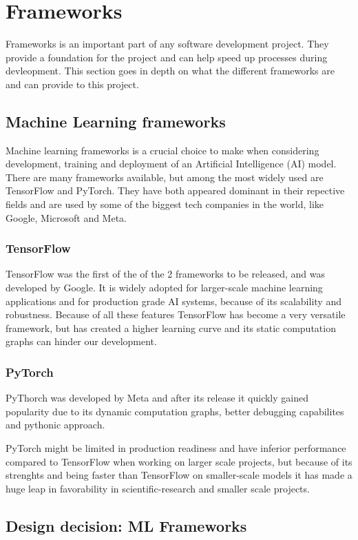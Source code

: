 \section{Frameworks}
\label{sec:Frameworks}

Frameworks is an important part of any software development project.
They provide a foundation for the project and can help speed up processes
during devleopment. This section goes in depth on what the different frameworks
are and can provide to this project.

\subsection{Machine Learning frameworks}

Machine learning frameworks is a crucial choice to make when considering development,
training and deployment of an Artificial Intelligence (AI) model.
There are many frameworks available, but among the most widely used are TensorFlow
and PyTorch. They have both appeared dominant in their repective fields and are used
by some of the biggest tech companies in the world, like Google, Microsoft and Meta.\cite{PyTorchVsTensorFlow}

\subsubsection{TensorFlow}
TensorFlow was the first of the of the 2 frameworks to be released,
and was developed by Google. \cite{TensorFlow} It is widely adopted for
larger-scale machine learning applications and for production grade AI systems,
because of its scalability and robustness. \cite{simplilearn}
Because of all these features TensorFlow has become a very versatile framework,
but has created a higher learning curve and its static computation graphs can hinder our development.

\subsubsection{PyTorch}
PyThorch was developed by Meta and after its release it quickly gained popularity due to its dynamic
computation graphs, better debugging capabilites and pythonic approach. \cite{PyTorch}

PyTorch might be limited in production readiness and have inferior performance compared to
TensorFlow when working on larger scale projects, but because of its strenghts and being faster
than TensorFlow on smaller-scale models it has made a huge leap in favorability in
scientific-research and smaller scale projects. \cite{simplilearn}

\subsection{Design decision: ML Frameworks}


